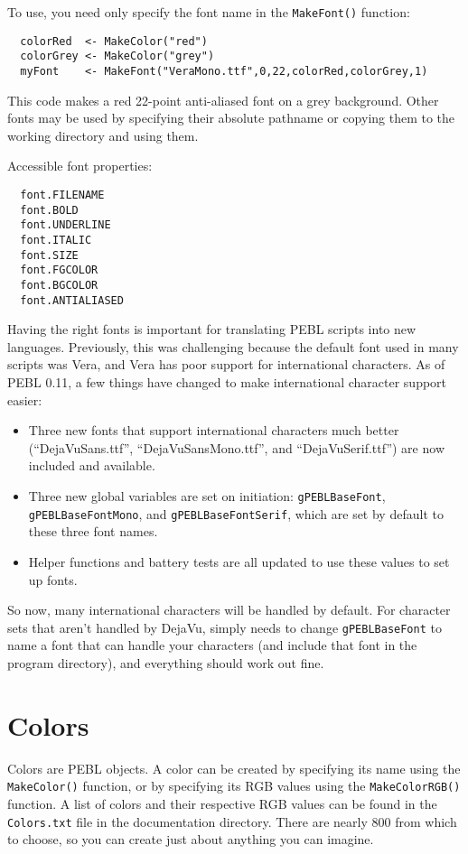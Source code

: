 To use, you need only specify the font name in the \texttt{MakeFont()} function:
\begin{verbatim}
  colorRed  <- MakeColor("red")
  colorGrey <- MakeColor("grey")
  myFont    <- MakeFont("VeraMono.ttf",0,22,colorRed,colorGrey,1)
\end{verbatim}
This code makes a red 22-point anti-aliased font on a grey background. 
Other fonts may be used by specifying their absolute pathname 
or copying them to the working directory and using them.



Accessible font properties:
\begin{verbatim}
  font.FILENAME
  font.BOLD
  font.UNDERLINE
  font.ITALIC
  font.SIZE
  font.FGCOLOR
  font.BGCOLOR
  font.ANTIALIASED
\end{verbatim}
 

Having the right fonts is important for translating PEBL scripts into
new languages.  Previously, this was challenging because the default
font used in many scripts was Vera, and Vera has poor support for international
characters. As of  PEBL 0.11, a few things have changed to make
international character support easier:
\begin{itemize}
\item Three new fonts that support international characters much
  better (``DejaVuSans.ttf'', ``DejaVuSansMono.ttf'', and
  ``DejaVuSerif.ttf'') are now included and available.
\item Three new global variables are set on initiation:
  \texttt{gPEBLBaseFont}, \texttt{gPEBLBaseFontMono}, and
  \texttt{gPEBLBaseFontSerif}, which are set by default to these
  three font names.
\item Helper functions and battery tests are all updated to use these
  values to set up fonts.
\end{itemize}

So now, many international characters will be handled by default.  For
character sets that aren't handled by DejaVu, simply needs to change
\texttt{gPEBLBaseFont} to name a font that can handle your characters
(and include that font in the program directory), and everything
should work out fine.

\section{Colors} 

Colors are PEBL objects.  A color can be created by specifying its name 
using the \texttt{MakeColor()} function, or by specifying its RGB values using the \texttt{MakeColorRGB()} function. A list of colors and their respective RGB values can be found in the \texttt{Colors.txt} file in the documentation directory. There are nearly 800 from which to choose, so you can create 
just about anything you can imagine.

